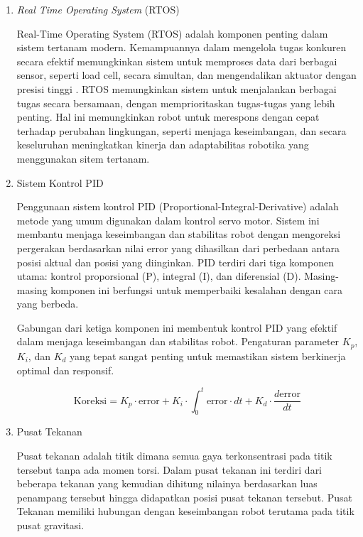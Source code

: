 \begin{enumerate}[label=\Alph*.]
    \item \textit{Real Time Operating System} (RTOS)
    \label{subsec:rtos}

    \hspace*{1em} Real-Time Operating System (RTOS) adalah komponen penting dalam sistem tertanam modern. Kemampuannya dalam mengelola tugas konkuren secara efektif memungkinkan sistem untuk memproses data dari berbagai sensor, seperti load cell, secara simultan, dan mengendalikan aktuator dengan presisi tinggi \cite{sayyad2023real}. RTOS memungkinkan sistem untuk menjalankan berbagai tugas secara bersamaan, dengan memprioritaskan tugas-tugas yang lebih penting\cite{digikey2021task}. Hal ini memungkinkan robot untuk merespons dengan cepat terhadap perubahan lingkungan, seperti menjaga keseimbangan, dan secara keseluruhan meningkatkan kinerja dan adaptabilitas robotika yang menggunakan sitem tertanam.

    \item Sistem Kontrol PID
    \label{subsec:sistemkontrolpid}

    \hspace*{1em} Penggunaan sistem kontrol PID (Proportional-Integral-Derivative) adalah metode yang umum digunakan dalam kontrol servo motor. Sistem ini membantu menjaga keseimbangan dan stabilitas robot dengan mengoreksi pergerakan berdasarkan nilai error yang dihasilkan dari perbedaan antara posisi aktual dan posisi yang diinginkan. PID terdiri dari tiga komponen utama: kontrol proporsional (P), integral (I), dan diferensial (D). Masing-masing komponen ini berfungsi untuk memperbaiki kesalahan dengan cara yang berbeda.

    \hspace*{1em} Gabungan dari ketiga komponen ini membentuk kontrol PID yang efektif dalam menjaga keseimbangan dan stabilitas robot. Pengaturan parameter $K_p$, $K_i$, dan $K_d$ yang tepat sangat penting untuk memastikan sistem berkinerja optimal dan responsif.

    \begin{equation}
      \mathrm{Koreksi} = K_p \cdot \mathrm{error} + K_i \cdot \int_{0}^{t} \mathrm{error} \cdot dt + K_d \cdot \frac{d\mathrm{error}}{dt}
    \end{equation}

    \item Pusat Tekanan
    \label{subsec:pusattekanan}

    \hspace*{1em} Pusat tekanan adalah titik dimana semua gaya terkonsentrasi pada titik tersebut tanpa ada momen torsi\cite{hawley2016external}. Dalam pusat tekanan ini terdiri dari beberapa tekanan yang kemudian dihitung nilainya berdasarkan luas penampang tersebut hingga didapatkan posisi pusat tekanan tersebut. Pusat Tekanan memiliki hubungan dengan keseimbangan robot terutama pada titik pusat gravitasi\cite{arifin2017implementasi}.


\end{enumerate}
